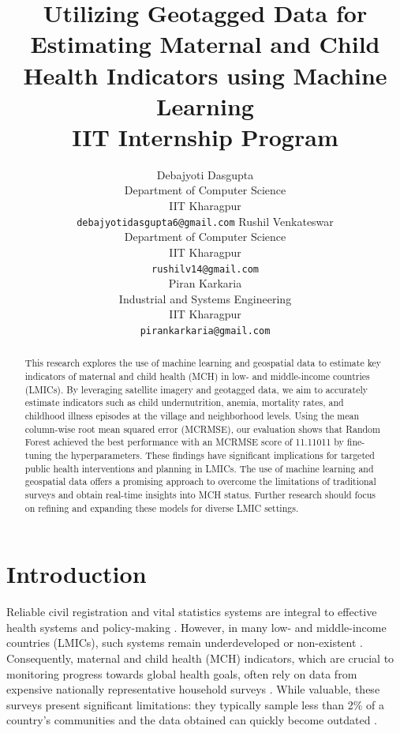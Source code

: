 \documentclass{article}
\title{
  Utilizing Geotagged Data for Estimating Maternal and Child Health Indicators using Machine Learning\\
  \vspace{1em}
  \small{\normalfont IIT Internship Program}  %
}
\author{
  Debajyoti Dasgupta \\
  Department of Computer Science \\
  IIT Kharagpur \\
  \texttt{debajyotidasgupta6@gmail.com}
  \And
  Rushil Venkateswar \\
  Department of Computer Science \\
  IIT Kharagpur \\
  \texttt{rushilv14@gmail.com} \\
  \And
  Piran Karkaria \\
  Industrial and Systems Engineering \\
  IIT Kharagpur \\
  \texttt{pirankarkaria@gmail.com}
}
\begin{document}
\maketitle

\begin{abstract}
This research explores the use of machine learning and geospatial data to estimate key indicators of maternal and child health (MCH) in low- and middle-income countries (LMICs). By leveraging satellite imagery and geotagged data, we aim to accurately estimate indicators such as child undernutrition, anemia, mortality rates, and childhood illness episodes at the village and neighborhood levels. Using the mean column-wise root mean squared error (MCRMSE), our evaluation shows that Random Forest achieved the best performance with an MCRMSE score of 11.11011 by fine-tuning the hyperparameters. These findings have significant implications for targeted public health interventions and planning in LMICs. The use of machine learning and geospatial data offers a promising approach to overcome the limitations of traditional surveys and obtain real-time insights into MCH status. Further research should focus on refining and expanding these models for diverse LMIC settings.
\end{abstract}



\section{Introduction}

Reliable civil registration and vital statistics systems are integral to effective health systems and policy-making \cite{AbouZahr2015}. However, in many low- and middle-income countries (LMICs), such systems remain underdeveloped or non-existent \cite{Phillips2015}. Consequently, maternal and child health (MCH) indicators, which are crucial to monitoring progress towards global health goals, often rely on data from expensive nationally representative household surveys \cite{Boerma2014}. While valuable, these surveys present significant limitations: they typically sample less than 2\%  of a country's communities and the data obtained can quickly become outdated \cite{Pedersen2019}.
\end{document}
